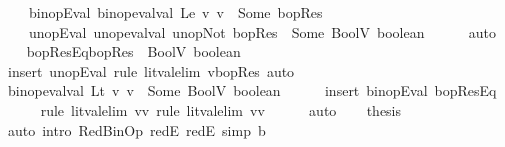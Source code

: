 \begin{isabellebody}
\ \ \ \ binopEval{\isacharcolon}{\kern0pt}\ {\isachardoublequoteopen}binop{\isacharunderscore}{\kern0pt}eval{\isacharunderscore}{\kern0pt}val\ Le\ v{}\ v{}\ {\isacharequal}{\kern0pt}\ Some\ bopRes{\isachardoublequoteclose}\ \isanewline
\ \ \ \ unopEval{\isacharcolon}{\kern0pt}\ {\isachardoublequoteopen}unop{\isacharunderscore}{\kern0pt}eval{\isacharunderscore}{\kern0pt}val\ unop{\isachardot}{\kern0pt}Not\ bopRes\ {\isacharequal}{\kern0pt}\ Some\ {\isacharparenleft}{\kern0pt}BoolV\ boolean{\isacharparenright}{\kern0pt}{\isachardoublequoteclose}\isanewline
\ \ \ \ \isamarkupfalse%
\ auto\isanewline
\isanewline
\ \ \isamarkupfalse%
\ bopResEq{\isacharcolon}{\kern0pt}{\isachardoublequoteopen}bopRes\ {\isacharequal}{\kern0pt}\ BoolV\ {\isacharparenleft}{\kern0pt}{\isasymnot}boolean{\isacharparenright}{\kern0pt}{\isachardoublequoteclose}\ \isanewline
\ \ \ \ \isamarkupfalse%
\ {\isacharparenleft}{\kern0pt}insert\ unopEval{\isacharcomma}{\kern0pt}\ rule\ lit{\isacharunderscore}{\kern0pt}val{\isacharunderscore}{\kern0pt}elim{\isacharbrackleft}{\kern0pt}\ v{\isacharequal}{\kern0pt}bopRes{\isacharbrackright}{\kern0pt}{\isacharparenright}{\kern0pt}\ auto\isanewline
\isanewline
\ \ \isamarkupfalse%
\ {\isachardoublequoteopen}binop{\isacharunderscore}{\kern0pt}eval{\isacharunderscore}{\kern0pt}val\ Lt\ v{}\ v{}\ {\isacharequal}{\kern0pt}\ Some\ {\isacharparenleft}{\kern0pt}BoolV\ boolean{\isacharparenright}{\kern0pt}{\isachardoublequoteclose}\isanewline
\ \ \ \ \isamarkupfalse%
\ {\isacharparenleft}{\kern0pt}insert\ binopEval\ bopResEq{\isacharparenright}{\kern0pt}\isanewline
\ \ \ \ \isamarkupfalse%
\ {\isacharparenleft}{\kern0pt}rule\ lit{\isacharunderscore}{\kern0pt}val{\isacharunderscore}{\kern0pt}elim{\isacharbrackleft}{\kern0pt}\ v{\isacharequal}{\kern0pt}v{}{\isacharbrackright}{\kern0pt}{\isacharsemicolon}{\kern0pt}\ rule\ lit{\isacharunderscore}{\kern0pt}val{\isacharunderscore}{\kern0pt}elim{\isacharbrackleft}{\kern0pt}\ v{\isacharequal}{\kern0pt}v{}{\isacharbrackright}{\kern0pt}{\isacharparenright}{\kern0pt}\isanewline
\ \ \ \ \isamarkupfalse%
\ auto\isanewline
\isanewline
\ \ \isamarkupfalse%
\ {\isacharquery}{\kern0pt}thesis\isanewline
\ \ \ \ \isamarkupfalse%
\ {\isacharparenleft}{\kern0pt}auto\ intro{\isacharcolon}{\kern0pt}\ RedBinOp\ redE{}\ redE{}\ simp{\isacharcolon}{\kern0pt}\ {\isacartoucheopen}b\ {\isacharequal}{\kern0pt}\ {\isacharunderscore}{\kern0pt}{\isacartoucheclose}{\isacharparenright}{\kern0pt}\isanewline

\end{isabellebody}
